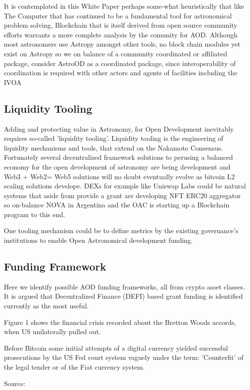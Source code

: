 \documentclass[final,5p,times,twocolumn,authoryear]{elsarticle}
\begin{document}
It is contemplated in this White Paper perhaps some-what heuristically that like The Computer that has continued to be a fundamental tool for astronomical problem solving, Blockchain that is itself derived from open source community efforts warrants a more complete analysis by the comunity for AOD. Although most astronomers use Astropy amongst other tools, no block chain modules yet exist on Astropy so we on balance of a community coordinated or affiliated package, consider AstroOD as a coordinated package, since interoperability of coordination is required with other actors and agents of facilities including the IVOA 
\subsection{Liquidity Tooling}
\label{btc2:sec:sub:liquidity}
Adding and protecting value in Astronomy, for Open Development inevitably requires so-called 'liquidity tooling'. Liquidity tooling is the engineering of liquidity mechanisms and tools, that extend on the Nakamoto Consensus. Fortunately several decentralized framework solutions to perusing a balanced economy for the open development of astronomy are being development and Web3 + Web2= Web5 solutions will no doubt eventually evolve as bitcoin L2 scaling solutions develope. DEXs for example like Uniswap Labs could be natural systems that aside from provide a grant are developing NFT ERC20 aggregator so on-balance NOVA in Argentina and the OAC is starting up a Blockchain program to this end.

One tooling mechanism could be to define metrics by the existing governance's institutions to enable Open Astronomical development funding.
\subsection{Funding Framework}

Here we identify possible AOD funding frameworks, all from crypto asset classes.  It is argued that Decentralized Finance (DEFI) based grant funding is identified currently as the most useful.

Figure 1 shows the financial crisis recorded about the Bretton Woods accords, when US unilaterally pulled out.

Before Bitcoin some initial attempts of a digital currency yielded successful prosecutions by the US Fed court system vaguely under the term: 'Counterfit' of the legal tender or of the Fiat currency system. 

Source:  
 
\end{document}
